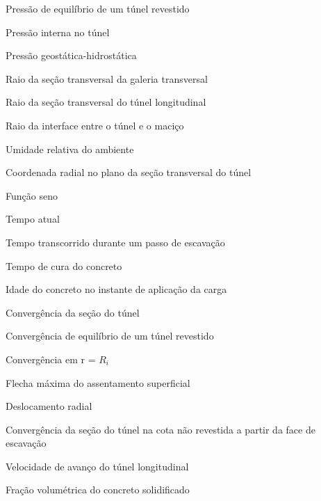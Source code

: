 \item[$p_{eq}$]							Pressão de equilíbrio de um túnel revestido
\item[$P_i$]							Pressão interna no túnel
\item[$P_{\infty}$]						Pressão geostática-hidrostática
\item[$R_g$]							Raio da seção transversal da galeria transversal
\item[$R_t$]							Raio da seção transversal do túnel longitudinal
\item[$R_i$]							Raio da interface entre o túnel e o maciço
\item[$RH$]								Umidade relativa do ambiente
\item[$r$]								Coordenada radial no plano da seção transversal do túnel
\item[sin]								Função seno
\item[$t$]								Tempo atual
\item[$t_p$]							Tempo transcorrido durante um passo de escavação
\item[$t_s$]							Tempo de cura do concreto
\item[$t_0$]							Idade do concreto no instante de aplicação da carga
\item[$U$]								Convergência da seção do túnel
\item[$U_{eq}$]							Convergência de equilíbrio de um túnel revestido
\item[$U_i$]							Convergência em r = $R_i$
\item[$u_{max}$]						Flecha máxima do assentamento superficial
\item[$u_r$]							Deslocamento radial
\item[$U_0$]							Convergência da seção do túnel na cota não revestida a partir da face de escavação
\item[$V_p$]							Velocidade de avanço do túnel longitudinal
\item[$v_t$]							Fração volumétrica do concreto solidificado



